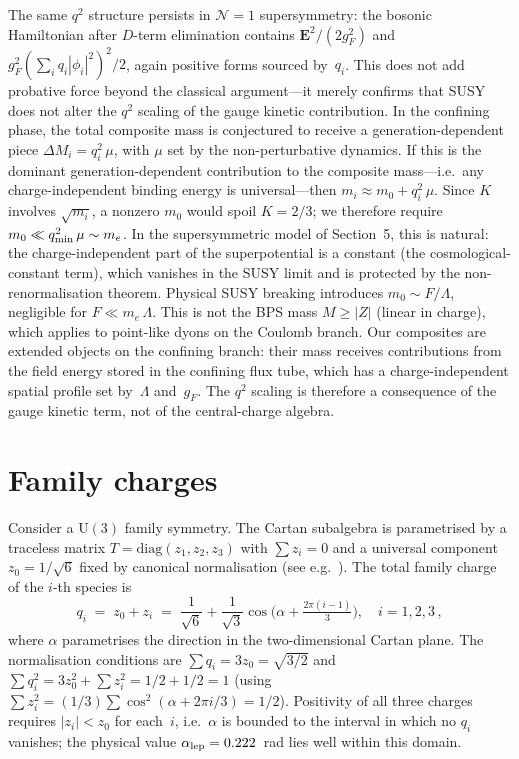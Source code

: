 \documentclass[preprint,12pt]{elsarticle}
\newcommand{\UU}{\mathrm{U}}
\begin{document}
The same $q^2$ structure persists in $\mathcal{N}{=}1$
supersymmetry: the bosonic Hamiltonian after $D$-term
elimination contains $\mathbf{E}^2/(2g_F^2)$ and
$g_F^2(\sum_i q_i|\phi_i|^2)^2/2$, again positive
forms sourced by~$q_i$.
This does not add probative force beyond the
classical argument---it merely confirms that SUSY
does not alter the $q^2$ scaling of the gauge
kinetic contribution.
In the confining phase, the total composite mass is
conjectured to receive a generation-dependent
piece $\Delta M_i = q_i^2\,\mu$, with $\mu$ set by
the non-perturbative dynamics.
If this is the dominant generation-dependent contribution
to the composite mass---i.e.\ any charge-independent
binding energy is universal---then
$m_i \approx m_0 + q_i^2\,\mu$.
Since $K$ involves $\sqrt{m_i}$, a nonzero $m_0$
would spoil $K = 2/3$; we therefore require
$m_0 \ll q_{\rm min}^2\,\mu \sim m_e$.
In the supersymmetric model of Section~5,
this is natural: the charge-independent part
of the superpotential is a constant
(the cosmological-constant term),
which vanishes in the SUSY limit and is
protected by the non-renormalisation theorem.
Physical SUSY breaking introduces
$m_0 \sim F/\Lambda$, negligible for
$F \ll m_e\,\Lambda$.
This is not the BPS mass $M \geq |Z|$
(linear in charge), which applies to
point-like dyons on the Coulomb branch.
Our composites are extended objects on the
confining branch: their mass receives
contributions from the field energy stored
in the confining flux tube, which has a
charge-independent spatial profile set
by~$\Lambda$ and~$g_F$.
The $q^2$ scaling is therefore a consequence
of the gauge kinetic term, not of the
central-charge algebra.

\section{Family charges}
Consider a $\UU(3)$ family symmetry.
The Cartan subalgebra is parametrised by a traceless
matrix $T = \mathrm{diag}(z_1, z_2, z_3)$ with
$\sum z_i = 0$ and a universal component $z_0 = 1/\sqrt{6}$
fixed by canonical normalisation
(see e.g.~\cite{Georgi:1999,Foot:1994}).
The total family charge of the $i$-th species is
\begin{equation}
  q_i \;=\; z_0 + z_i
  \;=\; \frac{1}{\sqrt{6}}
    + \frac{1}{\sqrt{3}}\cos\!\bigl(\alpha + \tfrac{2\pi(i{-}1)}{3}\bigr),
  \quad i = 1,2,3\,,
  \label{eq:qi}
\end{equation}
where $\alpha$ parametrises the direction in the
two-dimensional Cartan plane.
The normalisation conditions are
$\sum q_i = 3z_0 = \sqrt{3/2}$ and
$\sum q_i^2 = 3z_0^2 + \sum z_i^2 = 1/2 + 1/2 = 1$
(using $\sum z_i^2 = (1/3)\sum\cos^2(\alpha{+}2\pi i/3) = 1/2$).
Positivity of all three charges requires
$|z_i| < z_0$ for each~$i$, i.e.\
$\alpha$ is bounded to the interval in which
no $q_i$ vanishes; the physical value
$\alpha_{\rm lep} = 0.222$~rad lies well within
this domain.
\end{document}
